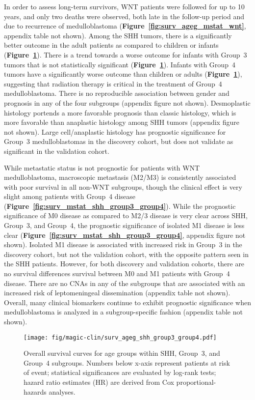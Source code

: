 \documentclass[11pt,letterpaper]{article}
\theoremstyle{definition}
\newcommand{\emphlab}[1]{\textbf{\textsf{#1}}}
\newcommand{\citefig}[1]{\emphlab{Figure~\ref{fig:#1}}}
\begin{document}
In order to assess long-term survivors, WNT patients were followed for up to 10 years, and only two deaths were observed, both late in the follow-up period and due to recurrence of medulloblastoma (\citefig{surv_ageg_mstat_wnt}, appendix table not shown).  Among the SHH tumors, there is a significantly better outcome in the adult patients as compared to children or infants (\citefig{surv_ageg_shh_group3_group4}).  There is a trend towards a worse outcome for infants with Group~3 tumors that is not statistically significant (\citefig{surv_ageg_shh_group3_group4}).  Infants with Group~4 tumors have a significantly worse outcome than children or adults (\citefig{surv_ageg_shh_group3_group4}), suggesting that radiation therapy is critical in the treatment of Group~4 medulloblastoma. There is no reproducible association between gender and prognosis in any of the four subgroups (appendix figure not shown). Desmoplastic histology portends a more favorable prognosis than classic histology, which is more favorable than anaplastic histology among SHH tumors (appendix figure not shown). Large cell/anaplastic histology has prognostic significance for Group~3 medulloblastomas in the discovery cohort, but does not validate as significant in the validation cohort.

While metastatic status is not prognostic for patients with WNT medulloblastoma, macroscopic metastasis (M2/M3) is consistently associated with poor survival in all non-WNT subgroups, though the clinical effect is very slight among patients with Group~4 disease (\citefig{surv_mstat_shh_group3_group4}).  While the prognostic significance of M0 disease as compared to M2/3 disease is very clear across SHH, Group~3, and Group~4, the prognostic significance of isolated M1 disease is less clear (\citefig{surv_mstat_shh_group3_group4}, appendix figure not shown). Isolated M1 disease is associated with increased risk in Group~3 in the discovery cohort, but not the validation cohort, with the opposite pattern seen in the SHH patients. However, for both discovery and validation cohorts, there are no survival differences survival between M0 and M1 patients with Group~4 disease. There are no CNAs in any of the subgroups that are associated with an increased risk of leptomeningeal dissemination (appendix table not shown). Overall, many clinical biomarkers continue to exhibit prognostic significance when medulloblastoma is analyzed in a subgroup-specific fashion (appendix table not shown).

\begin{figure}[ht]
	\begin{center}
		\texttt{[image: fig/magic-clin/surv\_ageg\_shh\_group3\_group4.pdf]}
	\end{center}
	\caption[Overall survival curves for age groups within SHH, Group~3, and Group~4 subgroups]
	{
	Overall survival curves for age groups within SHH, Group~3, and Group~4 subgroups.
	Numbers below x-axis represent patients at risk of event; statistical significances are evaluated by log-rank tests; hazard ratio estimates (HR) are derived from Cox proportional-hazards analyses.
	}
	\label{fig:surv_ageg_shh_group3_group4}
\end{figure}
\end{document}
